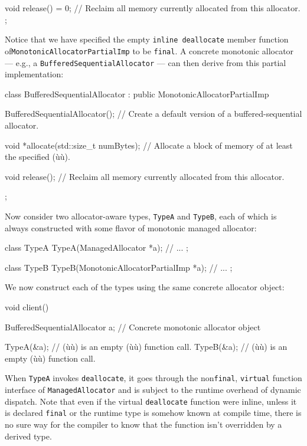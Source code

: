 {\begin{emcppslisting}
{    void release() = 0;
        // Reclaim all memory currently allocated from this allocator.
};
\end{emcppslisting}
    

\noindent Notice that we have specified the empty
\lstinline!inline!~\lstinline!deallocate! member function of\linebreak[4]
\lstinline!MonotonicAllocatorPartialImp! to be \lstinline!final!. A concrete
monotonic allocator --- e.g., a \lstinline!BufferedSequentialAllocator! ---
can then derive from this partial implementation:

\begin{emcppslisting}
class BufferedSequentialAllocator : public MonotonicAllocatorPartialImp
{
    BufferedSequentialAllocator();
        // Create a default version of a buffered-sequential allocator.

    void *allocate(std::size_t numBytes);
        // Allocate a block of memory of at least the specified (ù{}ù).

    void release();
        // Reclaim all memory currently allocated from this allocator.
};
\end{emcppslisting}
    

\noindent Now consider two allocator-aware types, \lstinline!TypeA! and
\lstinline!TypeB!, each of which is always constructed with some flavor of
monotonic managed allocator:

\begin{emcppslisting}
class TypeA
{
    TypeA(ManagedAllocator *a);
    // ...
};

class TypeB
{
    TypeB(MonotonicAllocatorPartialImp *a);
    // ...
};
\end{emcppslisting}
    

\enlargethispage{2ex}%
\noindent We now construct each of the types using the same concrete allocator
object:

\begin{emcppslisting}
void client()
{
    BufferedSequentialAllocator a;  // Concrete monotonic allocator object

    TypeA(&a);  // (ù{}ù) is an empty (ù{}ù) function call.
    TypeB(&a);  // (ù{}ù) is an empty (ù{}ù) function call.
}
\end{emcppslisting}
    

\noindent When \lstinline!TypeA! invokes \lstinline!deallocate!, it goes through the
non\lstinline!final!, \lstinline!virtual! function interface of
\lstinline!ManagedAllocator! and is subject to the runtime overhead of
dynamic dispatch. Note that even if the virtual \lstinline!deallocate!
function were inline, unless it is declared \lstinline!final! or the
runtime type is somehow known at compile time, there is no sure way for
the compiler to know that the function isn't overridden by a derived
type.

}
